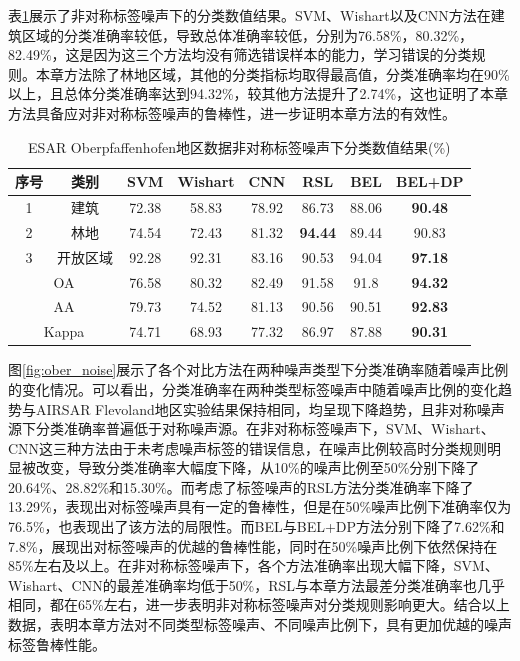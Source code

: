 表\ref{tab:ober_res_random}展示了非对称标签噪声下的分类数值结果。SVM、Wishart以及CNN方法在建筑区域的分类准确率较低，导致总体准确率较低，分别为76.58\%，80.32\%，82.49\%，这是因为这三个方法均没有筛选错误样本的能力，学习错误的分类规则。本章方法除了林地区域，其他的分类指标均取得最高值，分类准确率均在90\%以上，且总体分类准确率达到94.32\%，较其他方法提升了2.74\%，这也证明了本章方法具备应对非对称标签噪声的鲁棒性，进一步证明本章方法的有效性。
\begin{table}[ht!]
    \caption{ESAR Oberpfaffenhofen地区数据非对称标签噪声下分类数值结果(\%)}
    \label{tab:ober_res_random}
    \begin{tabular}{cccccccc}
        \toprule[1.5bp]
        序号                        & 类别    & SVM   & Wishart & CNN   & RSL            & BEL            & BEL+DP         \\
        \midrule[0.75bp]
        1                         & 建筑    & 72.38 & 58.83   & 78.92 & 86.73          & 88.06          & \textbf{90.48} \\
        2                         & 林地    & 74.54 & 72.43   & 81.32 & \textbf{94.44} & 89.44          & 90.83          \\
        3                         & 开放区域  & 92.28 & 92.31   & 83.16 & 90.53          & 94.04          & \textbf{97.18} \\
        \midrule[0.75bp]
        \multicolumn{2}{c}{OA}    & 76.58 & 80.32 & 82.49   & 91.58 & 91.8           & \textbf{94.32}                  \\
        \multicolumn{2}{c}{AA}    & 79.73 & 74.52 & 81.13   & 90.56 & 90.51          & \textbf{92.83}                  \\
        \multicolumn{2}{c}{Kappa} & 74.71 & 68.93 & 77.32   & 86.97 & 87.88          & \textbf{90.31}                  \\
        \bottomrule[0.75bp]
    \end{tabular}
\end{table}

图\ref{fig:ober_noise}展示了各个对比方法在两种噪声类型下分类准确率随着噪声比例的变化情况。可以看出，分类准确率在两种类型标签噪声中随着噪声比例的变化趋势与AIRSAR Flevoland地区实验结果保持相同，均呈现下降趋势，且非对称噪声源下分类准确率普遍低于对称噪声源。在非对称标签噪声下，SVM、Wishart、CNN这三种方法由于未考虑噪声标签的错误信息，在噪声比例较高时分类规则明显被改变，导致分类准确率大幅度下降，从10\%的噪声比例至50\%分别下降了20.64\%、28.82\%和15.30\%。而考虑了标签噪声的RSL方法分类准确率下降了13.29\%，表现出对标签噪声具有一定的鲁棒性，但是在50\%噪声比例下准确率仅为76.5\%，也表现出了该方法的局限性。而BEL与BEL+DP方法分别下降了7.62\%和7.8\%，展现出对标签噪声的优越的鲁棒性能，同时在50\%噪声比例下依然保持在85\%左右及以上。在非对称标签噪声下，各个方法准确率出现大幅下降，SVM、Wishart、CNN的最差准确率均低于50\%，RSL与本章方法最差分类准确率也几乎相同，都在65\%左右，进一步表明非对称标签噪声对分类规则影响更大。结合以上数据，表明本章方法对不同类型标签噪声、不同噪声比例下，具有更加优越的噪声标签鲁棒性能。

